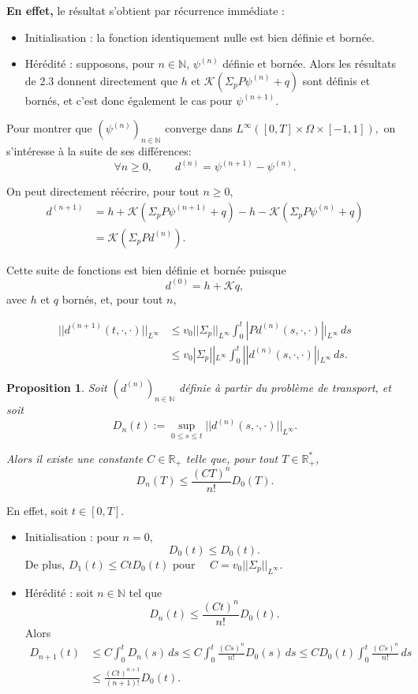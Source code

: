 \documentclass{article}
\newtheorem{proposition}[theorem]{Proposition}
\begin{document}
\textbf{En effet,} le résultat s’obtient par récurrence immédiate :
\begin{itemize}
    \item Initialisation : la fonction identiquement nulle est bien définie et bornée.

    \item Hérédité : supposons, pour $n\in\mathbb N$, $\psi^{(n)}$ définie et bornée. Alors les résultats de 2.3 donnent directement que $h$ et \(\mathcal K(\Sigma_pP\psi^{(n)}+q)\) sont définis et bornés, et c’est donc également le cas pour $\psi^{(n+1)}$.
\end{itemize}

\medskip

Pour montrer que \(\left(\psi^{(n)}\right)_{n\in\mathbb N}\) converge dans \(L^\infty([0,T]\times\Omega\times[-1,1]),\) on s’intéresse à la suite de ses différences:
\[
\forall n\geq0, \qquad d^{(n)} = \psi^{(n+1)}-\psi^{(n)}.
\]

On peut directement réécrire, pour tout $n\geq0$,
\begin{align}
    d^{(n+1)} &= h+\mathcal K(\Sigma_pP\psi^{(n+1)}+q)
    -h-\mathcal K(\Sigma_pP\psi^{(n)}+q) \\
    &= \mathcal K(\Sigma_pPd^{(n)}).
\end{align}

Cette suite de fonctions est bien définie et bornée puisque
\[d^{(0)} =h+\mathcal Kq,\]
avec $h$ et $q$ bornés, et, pour tout $n$,

\begin{align}
    ||d^{(n+1)}(t,\cdot,\cdot)||_{L^\infty} &\leq
    v_0||\Sigma_p||_{L^\infty} \int_0^t |Pd^{(n)}(s,\cdot,\cdot)||_{L^\infty}\,ds \\
    &\leq v_0|\Sigma_p||_{L^\infty} \int_0^t||d^{(n)}(s,\cdot,\cdot)||_{L^\infty}\,ds.
\end{align}

\begin{proposition}
    Soit \(\left(d^{(n)}\right)_{n\in\mathbb N}\) définie à partir du problème de transport, et soit
\[
D_n(t) :=\sup_{0\leq s\leq t} ||d^{(n)}(s,\cdot,\cdot)||_{L^\infty}.
\]

Alors il existe une constante $C\in\mathbb R_+$ telle que, pour tout $T\in\mathbb R_+^*$,
\[
D_n(T) \leq \frac{(CT)^n}{n!}D_0(T).
\]
\end{proposition}

En effet, soit $t\in[0,T]$.

\begin{itemize}
    \item Initialisation : pour $n=0$,
        \[ D_0(t) \leq D_0(t).\]
    De plus, \(D_1(t) \leq CtD_0(t)\) pour \(\quad  C = v_0||\Sigma_p||_{L^\infty}. \)

\item Hérédité : soit $n\in\mathbb N$ tel que
\[D_n(t) \leq \frac{(Ct)^n}{n!}D_0(t).\]
Alors
\begin{align*}
    D_{n+1}(t) &\leq C\int_0^tD_n(s)\,ds 
    \leq C\int_0^t \frac{(Cs)^n}{n!}D_0(s)\,ds
    \leq CD_0(t)\int_0^t\frac{(Cs)^n}{n!}\,ds \\
    &\leq \frac{(Ct)^{n+1}}{(n+1)!}D_0(t).
\end{align*}
\end{itemize}
\end{document}
